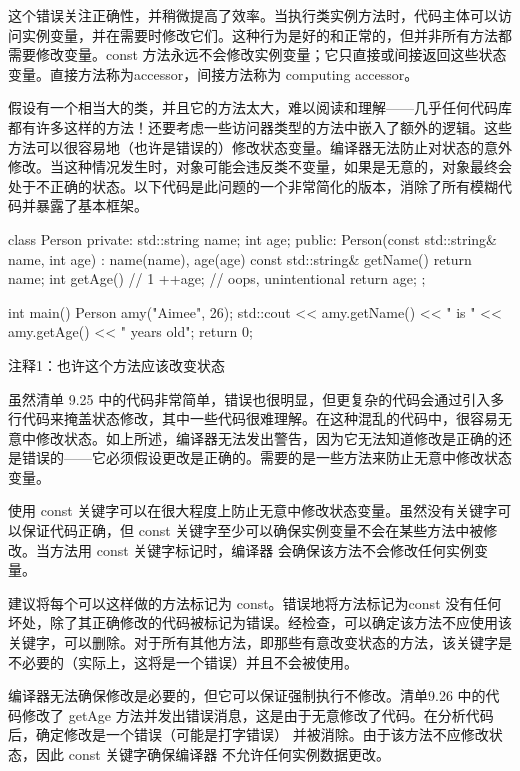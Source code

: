 这个错误关注正确性，并稍微提高了效率。当执行类实例方法时，代码主体可以访问实例变量，并在需要时修改它们。这种行为是好的和正常的，但并非所有方法都需要修改变量。const 方法永远不会修改实例变量；它只直接或间接返回这些状态变量。直接方法称为accessor，间接方法称为 computing accessor。


假设有一个相当大的类，并且它的方法太大，难以阅读和理解——几乎任何代码库都有许多这样的方法！还要考虑一些访问器类型的方法中嵌入了额外的逻辑。这些方法可以很容易地（也许是错误的）修改状态变量。编译器无法防止对状态的意外修改。当这种情况发生时，对象可能会违反类不变量，如果是无意的，对象最终会处于不正确的状态。以下代码是此问题的一个非常简化的版本，消除了所有模糊代码并暴露了基本框架。


\begin{cpp}
class Person {
private:
  std::string name;
  int age;
public:
  Person(const std::string& name, int age) : name(name), age(age) {}
  const std::string& getName() { return name; }
  int getAge() { // 1
    ++age; // oops, unintentional
    return age;
  }
};

int main() {
  Person amy("Aimee", 26);
  std::cout << amy.getName() << " is " << amy.getAge() << " years old\n";
  return 0;
}
\end{cpp}

{\footnotesize
注释1：也许这个方法应该改变状态
}


虽然清单 9.25 中的代码非常简单，错误也很明显，但更复杂的代码会通过引入多行代码来掩盖状态修改，其中一些代码很难理解。在这种混乱的代码中，很容易无意中修改状态。如上所述，编译器无法发出警告，因为它无法知道修改是正确的还是错误的——它必须假设更改是正确的。需要的是一些方法来防止无意中修改状态变量。


使用 const 关键字可以在很大程度上防止无意中修改状态变量。虽然没有关键字可以保证代码正确，但 const 关键字至少可以确保实例变量不会在某些方法中被修改。当方法用 const 关键字标记时，编译器 会确保该方法不会修改任何实例变量。

建议将每个可以这样做的方法标记为 const。错误地将方法标记为const 没有任何坏处，除了其正确修改的代码被标记为错误。经检查，可以确定该方法不应使用该关键字，可以删除。对于所有其他方法，即那些有意改变状态的方法，该关键字是不必要的（实际上，这将是一个错误）并且不会被使用。

编译器无法确保修改是必要的，但它可以保证强制执行不修改。清单9.26 中的代码修改了 getAge 方法并发出错误消息，这是由于无意修改了代码。在分析代码后，确定修改是一个错误（可能是打字错误） 并被消除。由于该方法不应修改状态，因此 const 关键字确保编译器 不允许任何实例数据更改。


